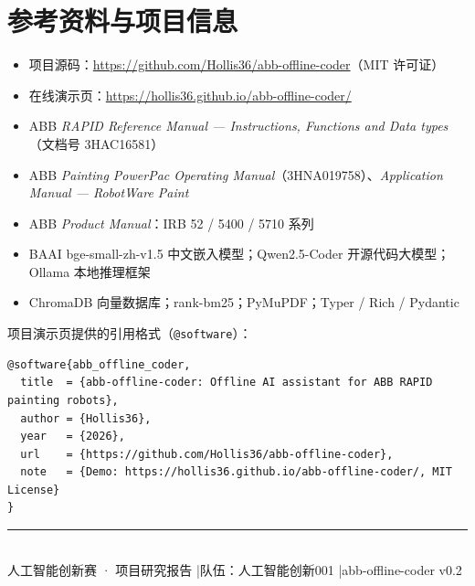 \documentclass[12pt,a4paper,fontset=none]{ctexart}
\begin{document}
\section*{参考资料与项目信息}
\small
\begin{itemize}
  \item 项目源码：\url{https://github.com/Hollis36/abb-offline-coder}（MIT 许可证）
  \item 在线演示页：\url{https://hollis36.github.io/abb-offline-coder/}
  \item ABB \textit{RAPID Reference Manual — Instructions, Functions and Data types}（文档号 3HAC16581）
  \item ABB \textit{Painting PowerPac Operating Manual}（3HNA019758）、\textit{Application Manual — RobotWare Paint}
  \item ABB \textit{Product Manual}：IRB 52 / 5400 / 5710 系列
  \item BAAI bge-small-zh-v1.5 中文嵌入模型；Qwen2.5-Coder 开源代码大模型；Ollama 本地推理框架
  \item ChromaDB 向量数据库；rank-bm25；PyMuPDF；Typer / Rich / Pydantic
\end{itemize}

\noindent 项目演示页提供的引用格式（\texttt{@software}）：
\begin{lstlisting}[style=base,basicstyle=\ttfamily\scriptsize]
@software{abb_offline_coder,
  title  = {abb-offline-coder: Offline AI assistant for ABB RAPID painting robots},
  author = {Hollis36},
  year   = {2026},
  url    = {https://github.com/Hollis36/abb-offline-coder},
  note   = {Demo: https://hollis36.github.io/abb-offline-coder/, MIT License}
}
\end{lstlisting}

\vspace{0.8cm}
\begin{center}
{\color{linegray}\rule{0.5\textwidth}{0.6pt}}\\[6pt]
{\sffamily\small\color{abbgray}
人工智能创新赛 · 项目研究报告 \quad|\quad 队伍：人工智能创新001 \quad|\quad abb-offline-coder v0.2}
\end{center}
\end{document}
